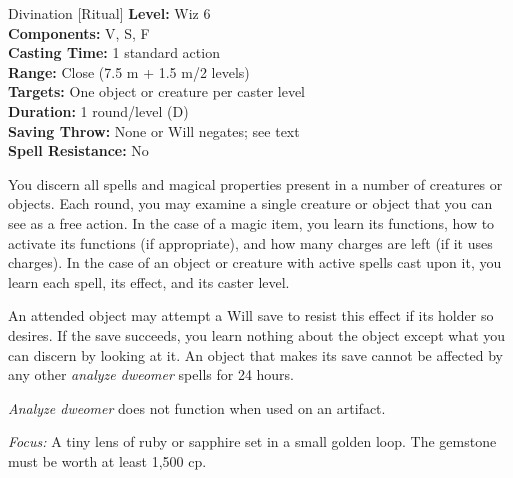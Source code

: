 {Divination [Ritual]}
{
	\textbf{Level:}
	Wiz 6\\
	\textbf{Components:}
	V, S, F\\
	\textbf{Casting Time:}
	1 standard action\\
	\textbf{Range:}
	Close (7.5 m + 1.5 m/2 levels)\\
	\textbf{Targets:}
	One object or creature per caster level\\
	\textbf{Duration:}
	1 round/level (D)\\
	\textbf{Saving Throw:}
	None or Will negates; see text\\
	\textbf{Spell Resistance:}
	No\\
}
{
	You discern all spells and magical properties present in a number of creatures or objects. Each round, you may examine a single creature or object that you can see as a free action. In the case of a magic item, you learn its functions, how to activate its functions (if appropriate), and how many charges are left (if it uses charges). In the case of an object or creature with active spells cast upon it, you learn each spell, its effect, and its caster level.

	An attended object may attempt a Will save to resist this effect if its holder so desires. If the save succeeds, you learn nothing about the object except what you can discern by looking at it. An object that makes its save cannot be affected by any other \emph{analyze dweomer} spells for 24 hours.

	\emph{Analyze dweomer} does not function when used on an artifact.

	\textit{Focus:}
	A tiny lens of ruby or sapphire set in a small golden loop. The gemstone must be worth at least 1,500 cp.

}
